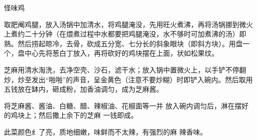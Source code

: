 \begin{recipe}{怪味鸡}

\ingredients


\cooking

\step 取肥阉鸡腿，放入汤锅中加清水，将鸡腿淹没，先用旺火煮沸，再将汤锅挪到微火上煮约二十分钟（在煨煮过程中水都要把鸡腿淹没，水不够时可加煮沸的汤）即熟。然后捞起晾冷，去骨，砍成五分宽、七分长的斜象眼块（即斜方块）。用盘一个，盘中心先将葱白丁放入，再将砍好的鸡块摆在上面，状如松果纹。

\step 芝麻用清水淘洗，去净空壳、沙石，滤干水；放入锅中置微火上，以手铲不停翻炒，炒至发出“啪啪”的声音，呈金黄色（注意不要炒糊）时即铲入碗内。然后取用五钱放在缽内，砸成粉，加香油调匀，成为芝麻酱。

将芝麻酱、酱油、白糖、醋、辣椒油、花椒面等一并 放入碗内调匀后，淋在摆好的鸡块上；然后撒上余下的芝麻 一钱即成。

\notes

此菜颜色纟了亮，质地细嫩，味鲜而不太辣，有强烈的麻 辣香味。

\end{recipe}

